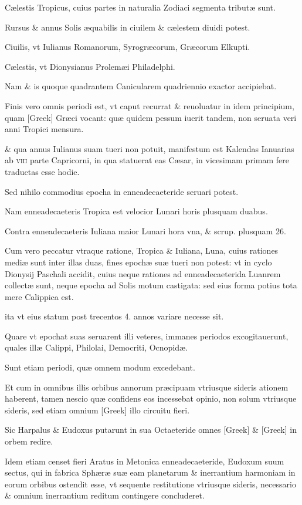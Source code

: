 Cælestis Tropicus,
cuius partes in naturalia Zodiaci segmenta tributæ sunt.

Rursus
\& annus Solis æquabilis in ciuilem \& cælestem diuidi potest.

Ciuilis,
vt Iulianus Romanorum, Syrogræcorum, Græcorum Elkupti.

Cælestis,
vt Dionysianus Prolemæi Philadelphi.

Nam \& is quoque quadrantem
Canicularem quadriennio exactor accipiebat.

Finis vero
omnis periodi est, vt caput recurrat \& reuoluatur in idem principium,
quam \textgreek{[Greek]} Græci vocant: quæ quidem pessum iuerit tandem,
non seruata veri anni Tropici mensura.

\& qua annus Iulianus 
suam tueri non potuit, manifestum est Kalendas Ianuarias ab \textsc{viii}
parte Capricorni, in qua statuerat eas Cæsar, in vicesimam primam
fere traductas esse hodie.

Sed nihilo commodius epocha in enneadecaeteride
seruari potest.

Nam enneadecaeteris Tropica est velocior
Lunari horis plusquam duabus.

Contra enneadecaeteris Iuliana
maior Lunari hora vna, \& scrup. plusquam 26.

Cum vero peccatur
vtraque ratione, Tropica \& Iuliana, Luna, cuius rationes mediæ sunt
inter illas duas, fines epochæ suæ tueri non potest: vt in cyclo Dionysij
Paschali accidit, cuius neque rationes ad enneadecaeterida Luanrem
collectæ sunt, neque epocha ad Solis motum castigata: sed eius
forma potius tota mere Calippica est.

ita vt eius statum post trecentos
4. annos variare necesse sit.

Quare vt epochat suas seruarent illi veteres,
immanes periodos excogitauerunt, quales illæ Calippi, Philolai, Democriti,
Ocnopidæ.

Sunt etiam periodi, quæ omnem modum excedebant.

Et cum in omnibus illis orbibus annorum præcipuam
vtriusque sideris ationem haberent, tamen nescio quæ confidens eos
incessebat opinio, non solum vtriusque sideris, sed etiam omnium
\textgreek{[Greek]} illo circuitu fieri.

Sic Harpalus \& Eudoxus putarunt
in sua Octaeteride omnes \textgreek{[Greek]}
 \& \textgreek{[Greek]} in orbem redire.

Idem etiam censet fieri Aratus in Metonica enneadecaeteride, Eudoxum
suum sectus, qui in fabrica Sphæræ suæ eam planetarum \& inerrantium
harmoniam in eorum orbibus ostendit esse, vt sequente
restitutione vtriusque sideris, necessario \& omnium inerrantium reditum
contingere concluderet.


